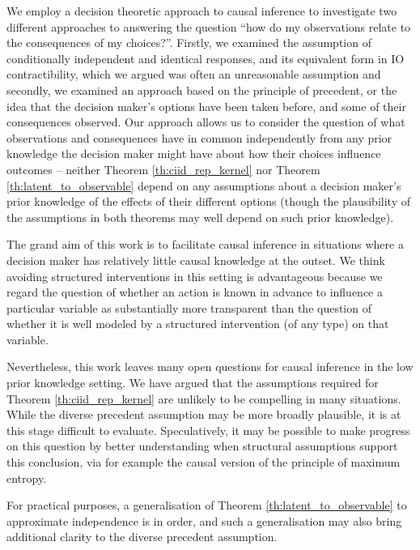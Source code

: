We employ a decision theoretic approach to causal inference to investigate two different approaches to answering the question ``how do my observations relate to the consequences of my choices?''. Firstly, we examined the assumption of conditionally independent and identical responses, and its equivalent form in IO contractibility, which we argued was often an unreasonable assumption and secondly, we examined an approach based on the principle of precedent, or the idea that the decision maker's options have been taken before, and some of their consequences observed. Our approach allows us to consider the question of what observations and consequences have in common independently from any prior knowledge the decision maker might have about how their choices influence outcomes -- neither Theorem \ref{th:ciid_rep_kernel} nor Theorem \ref{th:latent_to_observable} depend on any assumptions about a decision maker's prior knowledge of the effects of their different options (though the plausibility of the assumptions in both theorems may well depend on such prior knowledge).

The grand aim of this work is to facilitate causal inference in situations where a decision maker has relatively little causal knowledge at the outset. We think avoiding structured interventions in this setting is advantageous because we regard the question of whether an action is known in advance to influence a particular variable as substantially more transparent than the question of whether it is well modeled by a structured intervention (of any type) on that variable.

Nevertheless, this work leaves many open questions for causal inference in the low prior knowledge setting. We have argued that the assumptions required for Theorem \ref{th:ciid_rep_kernel} are unlikely to be compelling in many situations. While the diverse precedent assumption may be more broadly plausible, it is at this stage difficult to evaluate. Speculatively, it may be possible to make progress on this question by better understanding when structural assumptions support this conclusion, via for example the causal version of the principle of maximum entropy.

For practical purposes, a generalisation of Theorem \ref{th:latent_to_observable} to approximate independence is in order, and such a generalisation may also bring additional clarity to the diverse precedent assumption.

